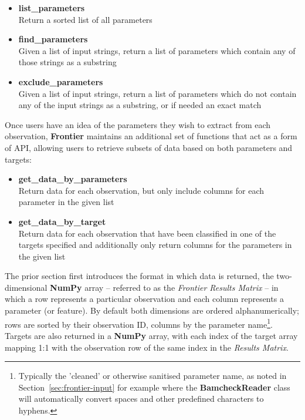 \begin{itemize}
    \item \textbf{list\_parameters} \hfill\\
        Return a sorted list of all parameters
    \item \textbf{find\_parameters} \hfill\\
        Given a list of input strings, return a list of parameters which contain
        any of those strings as a substring
    \item \textbf{exclude\_parameters} \hfill\\
        Given a list of input strings, return a list of parameters which do not
        contain any of the input strings as a substring, or if needed an exact
        match
\end{itemize}

Once users have an idea of the parameters they wish to extract from each
observation, \textbf{Frontier} maintains an additional set of functions that act
as a form of API, allowing users to retrieve subsets of data based on both
parameters and targets:

\begin{itemize}
    \item \textbf{get\_data\_by\_parameters} \hfill\\
        Return data for each observation, but only include columns
        for each parameter in the given list
    \item \textbf{get\_data\_by\_target} \hfill\\
        Return data for each observation that have been classified in one of the
        targets specified and additionally only return columns for the
        parameters in the given list
\end{itemize}

The prior section first introduces the format in which data is returned, the
two-dimensional \textbf{NumPy} array -- referred to as the \textit{Frontier Results
Matrix} -- in which a row represents a particular observation and each column
represents a parameter (or feature). By default both dimensions are
ordered alphanumerically; rows are sorted by their observation ID, columns by
the parameter name\footnote{Typically the 'cleaned' or otherwise sanitised
    parameter name, as noted in Section~\ref{sec:frontier-input} for example
where the \textbf{BamcheckReader} class will automatically convert spaces and
other predefined characters to hyphens.}. Targets are also returned in a
\textbf{NumPy} array, with each index of the target array mapping 1:1 with the
observation row of the same index in the \textit{Results Matrix}.



